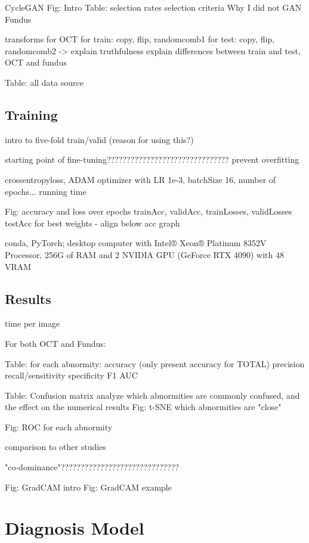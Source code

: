 \documentclass{article}
\begin{document}
			CycleGAN
				Fig: Intro
				Table: selection rates
				selection criteria
				Why I did not GAN Fundus
				
			transforms for OCT
				for train: copy, flip, randomcomb1
				for test: copy, flip, randomcomb2 -> explain truthfulness
				explain differences between train and test, OCT and fundus

			Table: all data source
			
		\subsection{Training}
			
			intro to five-fold train/valid (reason for using this?)
			
			starting point of fine-tuning???????????????????????????????
			prevent overfitting
			
			crossentropyloss, ADAM optimizer with LR 1e-3, batchSize 16, number of epochs...
			running time
			
			Fig: accuracy and loss over epochs
				trainAcc, validAcc, trainLosses, validLosses
				testAcc for best weights - align below acc graph
			
			conda, PyTorch;
			desktop computer with Intel® Xeon® Platinum 8352V Processor, 256G of RAM and 2 NVIDIA GPU (GeForce RTX 4090) with 48 VRAM
			
		\subsection{Results}
			
			time per image
			
			For both OCT and Fundus:
			
				Table: for each abnormity:
					accuracy (only present accuracy for TOTAL)
					precision
					recall/sensitivity
					specificity
					F1
					AUC
					
				Table: Confusion matrix
					analyze which abnormities are commonly confused, and the effect on the numerical results
				Fig: t-SNE
					which abnormities are "close"
				
				Fig: ROC for each abnormity
				
				comparison to other studies
				
			"co-dominance"??????????????????????????????
				
			Fig: GradCAM intro
			Fig: GradCAM example
		
	\section{Diagnosis Model}
	
\end{document}
